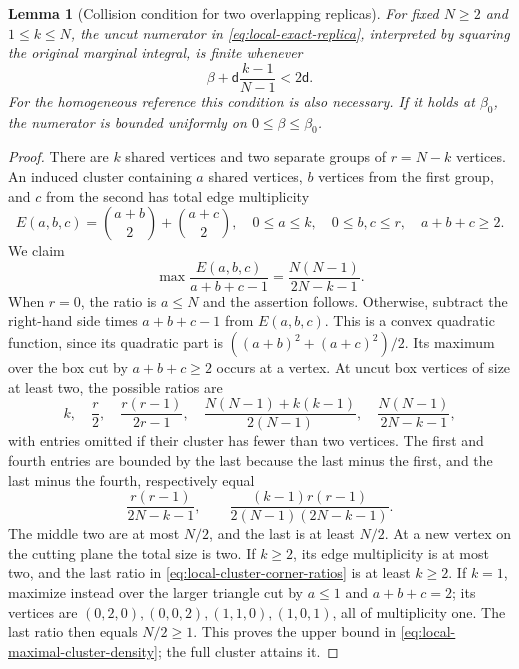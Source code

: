 \documentclass[11pt,reqno]{amsart}
\numberwithin{equation}{section}
\theoremstyle{plain}
\newtheorem{lemma}[lemma]{Lemma}
\theoremstyle{definition}
\renewcommand{\d}{\mathsf d}
\newcommand{\be}{\beta}
\begin{document}
\begin{lemma}[Collision condition for two overlapping replicas]
\label{lem:local-replica-collisions}
For fixed $N\geq2$ and $1\leq k\leq N$, the uncut numerator in \eqref{eq:local-exact-replica}, interpreted by squaring the original marginal integral, is finite whenever
\begin{equation}
 \be+\d\frac{k-1}{N-1}<2\d.
 \label{eq:local-replica-collision-condition}
\end{equation}
For the homogeneous reference this condition is also necessary. If it holds at $\be_0$, the numerator is bounded uniformly on $0\leq\be\leq\be_0$.
\end{lemma}
\begin{proof}
There are $k$ shared vertices and two separate groups of $r=N-k$ vertices. An induced cluster containing $a$ shared vertices, $b$ vertices from the first group, and $c$ from the second has total edge multiplicity
\begin{equation}
 E(a,b,c)=\binom{a+b}{2}+\binom{a+c}{2},
 \quad 0\leq a\leq k,\quad 0\leq b,c\leq r,
 \quad a+b+c\geq2.
 \label{eq:local-replica-edge-count}
\end{equation}
We claim
\begin{equation}
 \max\frac{E(a,b,c)}{a+b+c-1}
 =\frac{N(N-1)}{2N-k-1}.
 \label{eq:local-maximal-cluster-density}
\end{equation}
When $r=0$, the ratio is $a\leq N$ and the assertion follows. Otherwise, subtract the right-hand side times $a+b+c-1$ from $E(a,b,c)$. This is a convex quadratic function, since its quadratic part is $((a+b)^2+(a+c)^2)/2$. Its maximum over the box cut by $a+b+c\geq2$ occurs at a vertex. At uncut box vertices of size at least two, the possible ratios are
\begin{equation}
 k,\quad \frac r2,\quad\frac{r(r-1)}{2r-1},\quad
 \frac{N(N-1)+k(k-1)}{2(N-1)},\quad
 \frac{N(N-1)}{2N-k-1},
 \label{eq:local-cluster-corner-ratios}
\end{equation}
with entries omitted if their cluster has fewer than two vertices. The first and fourth entries are bounded by the last because the last minus the first, and the last minus the fourth, respectively equal
\begin{equation}
 \frac{r(r-1)}{2N-k-1},\qquad
 \frac{(k-1)r(r-1)}{2(N-1)(2N-k-1)}.
 \label{eq:local-cluster-corner-differences}
\end{equation}
The middle two are at most $N/2$, and the last is at least $N/2$. At a new vertex on the cutting plane the total size is two. If $k\geq2$, its edge multiplicity is at most two, and the last ratio in \eqref{eq:local-cluster-corner-ratios} is at least $k\geq2$. If $k=1$, maximize instead over the larger triangle cut by $a\leq1$ and $a+b+c=2$; its vertices are $(0,2,0),(0,0,2),(1,1,0),(1,0,1)$, all of multiplicity one. The last ratio then equals $N/2\geq1$. This proves the upper bound in \eqref{eq:local-maximal-cluster-density}; the full cluster attains it.


\end{proof}
\end{document}
